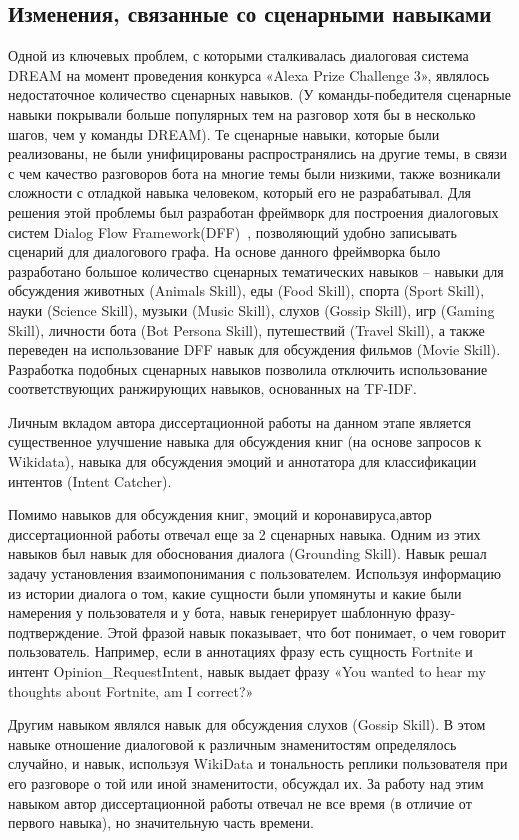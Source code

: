 \subsection{Изменения, связанные со сценарными навыками}
Одной из ключевых проблем, с которыми сталкивалась диалоговая система {DREAM} на момент проведения конкурса «Alexa Prize Challenge 3», являлось недостаточное количество сценарных навыков. (У команды-победителя сценарные навыки покрывали больше популярных тем на разговор хотя бы в несколько шагов, чем у команды DREAM). Те сценарные навыки, которые были реализованы, не были унифицированы распространялись на другие темы, в связи с чем качество разговоров бота на многие темы были низкими, также возникали сложности с отладкой навыка человеком, который его не разрабатывал. Для решения этой проблемы был разработан фреймворк для построения диалоговых систем Dialog Flow Framework(DFF)~\cite{dff}, позволяющий удобно записывать сценарий для диалогового графа. На основе данного фреймворка было разработано большое количество сценарных тематических навыков -- навыки для обсуждения животных (Animals Skill), еды (Food Skill), спорта (Sport Skill), науки (Science Skill), музыки (Music Skill), слухов (Gossip Skill), игр (Gaming Skill), личности бота (Bot Persona Skill), путешествий (Travel Skill), а также переведен на использование DFF навык для обсуждения фильмов (Movie Skill). Разработка подобных сценарных навыков позволила отключить использование соответствующих ранжирующих навыков, основанных на TF-IDF.

Личным вкладом автора диссертационной работы на данном этапе является существенное улучшение навыка для обсуждения книг (на основе запросов к Wikidata), навыка для обсуждения эмоций и аннотатора для классификации интентов (Intent Catcher).

Помимо навыков для обсуждения книг, эмоций и коронавируса,автор диссертационной работы отвечал еще за 2 сценарных навыка.
Одним из этих навыков был навык для обоснования диалога (Grounding Skill). Навык решал задачу установления взаимопонимания с пользователем. Используя информацию из истории диалога о том, какие сущности были упомянуты и какие были намерения у пользователя и у бота, навык генерирует шаблонную фразу-подтверждение. Этой фразой навык показывает, что бот понимает, о чем говорит пользователь. Например, если в аннотациях фразу есть сущность Fortnite и интент Opinion\_RequestIntent, навык выдает фразу «You wanted to hear my thoughts about Fortnite, am I correct?»

Другим навыком являлся навык для обсуждения слухов (Gossip Skill). В этом навыке отношение диалоговой к различным знаменитостям определялось случайно, и навык, используя WikiData и тональность реплики пользователя при его разговоре о той или иной знаменитости, обсуждал их. За работу над этим навыком автор диссертационной работы отвечал не все время (в отличие от первого навыка), но значительную часть времени.

